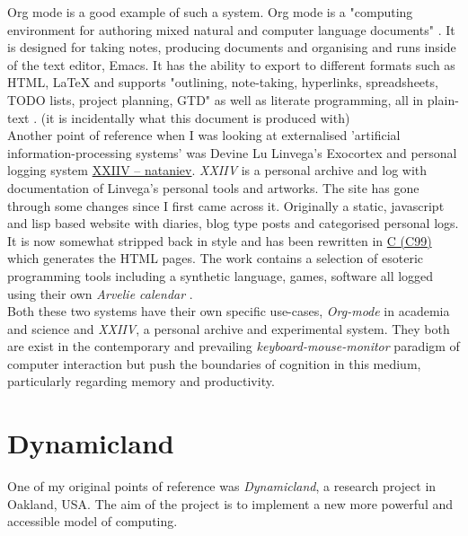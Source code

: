 \documentclass[12pt]{report}
\begin{document}
Org mode is a good example of such a system. Org mode is a "computing
environment for authoring mixed natural and computer language documents"
\cite{Schulte:Davison:Dye:Dominik:2011:JSSOBK:v46i03}. It is designed for taking
notes, producing documents and organising and runs inside of the text editor,
Emacs. It has the ability to export to different formats such as HTML, \LaTeX{} and
supports "outlining, note-taking, hyperlinks, spreadsheets, TODO lists, project
planning, GTD" as well as literate programming, all in plain-text
\cite{Schulte:Davison:Dye:Dominik:2011:JSSOBK:v46i03}. (it is incidentally what
this document is produced with) \\


Another point of reference when I was looking at externalised 'artificial
information-processing systems' was Devine Lu Linvega's Exocortex and personal
logging system \href{https://wiki.xxiivv.com/site/nataniev.html}{XXIIV -- nataniev}. \emph{XXIIV} is a personal archive and log with
documentation of Linvega's personal tools and artworks. The site has gone
through some changes since I first came across it. Originally a static,
javascript and lisp based website with diaries, blog type posts and categorised
personal logs. It is now somewhat stripped back in style and has been rewritten
in \href{https://en.wikipedia.org/wiki/C99}{C (C99)} which generates the HTML pages. The work contains a selection of
esoteric programming tools including a synthetic language, games, software all
logged using their own \emph{Arvelie calendar} \cite{DevineNataniev}. \\

Both these two systems have their own specific use-cases, \emph{Org-mode} in academia
and science and \emph{XXIIV}, a personal archive and experimental system. They both
are exist in the contemporary and prevailing \emph{keyboard-mouse-monitor} paradigm
of computer interaction but push the boundaries of cognition in this medium,
particularly regarding memory and productivity.



\section{Dynamicland}
\label{sec:org64c773d}

One of my original points of reference was \emph{Dynamicland}, a research project in
Oakland, USA. The aim of the project is to implement a new more powerful and
accessible model of computing.
\end{document}
